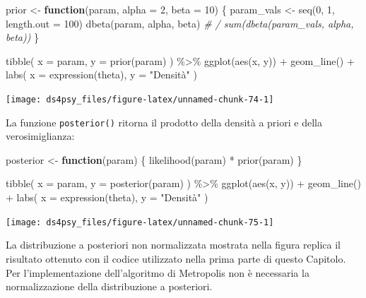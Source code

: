 \documentclass[
  11pt,
]{krantz}
\makeatletter
\newenvironment{Shaded}{\begin{snugshade}}{\end{snugshade}}
\newcommand{\AttributeTok}[1]{\textcolor[rgb]{0.61,0.61,0.61}{#1}}
\newcommand{\CommentTok}[1]{\textcolor[rgb]{0.37,0.37,0.37}{\textit{#1}}}
\newcommand{\ControlFlowTok}[1]{\textcolor[rgb]{0.27,0.27,0.27}{\textbf{#1}}}
\newcommand{\DecValTok}[1]{\textcolor[rgb]{0.06,0.06,0.06}{#1}}
\newcommand{\FunctionTok}[1]{\textcolor[rgb]{0,0,0}{#1}}
\newcommand{\NormalTok}[1]{#1}
\newcommand{\OtherTok}[1]{\textcolor[rgb]{0.37,0.37,0.37}{#1}}
\newcommand{\SpecialCharTok}[1]{\textcolor[rgb]{0,0,0}{#1}}
\newcommand{\StringTok}[1]{\textcolor[rgb]{0.5,0.5,0.5}{#1}}
\newenvironment{kframe}{%
\medskip{}
\setlength{\fboxsep}{.8em}
 \def\at@end@of@kframe{}%
 \ifinner\ifhmode%
  \def\at@end@of@kframe{\end{minipage}}%
  \begin{minipage}{\columnwidth}%
 \fi\fi%
 \def\FrameCommand##1{\hskip\@totalleftmargin \hskip-\fboxsep
 \colorbox{shadecolor}{##1}\hskip-\fboxsep
     \hskip-\linewidth \hskip-\@totalleftmargin \hskip\columnwidth}%
 \MakeFramed {\advance\hsize-\width
   \@totalleftmargin\z@ \linewidth\hsize
   \@setminipage}}%
 {\par\unskip\endMakeFramed%
 \at@end@of@kframe}
\renewenvironment{Shaded}{\begin{kframe}}{\end{kframe}}
\theoremstyle{definition}
\theoremstyle{definition}
\theoremstyle{definition}
\theoremstyle{definition}
\theoremstyle{remark}
\makeatother
\begin{document}
\begin{Shaded}
\begin{Highlighting}[]
\NormalTok{prior }\OtherTok{\textless{}{-}} \ControlFlowTok{function}\NormalTok{(param, }\AttributeTok{alpha =} \DecValTok{2}\NormalTok{, }\AttributeTok{beta =} \DecValTok{10}\NormalTok{) \{}
\NormalTok{  param\_vals }\OtherTok{\textless{}{-}} \FunctionTok{seq}\NormalTok{(}\DecValTok{0}\NormalTok{, }\DecValTok{1}\NormalTok{, }\AttributeTok{length.out =} \DecValTok{100}\NormalTok{)}
  \FunctionTok{dbeta}\NormalTok{(param, alpha, beta) }\CommentTok{\# / sum(dbeta(param\_vals, alpha, beta))}
\NormalTok{\}}

\FunctionTok{tibble}\NormalTok{(}
  \AttributeTok{x =}\NormalTok{ param, }
  \AttributeTok{y =} \FunctionTok{prior}\NormalTok{(param)}
\NormalTok{) }\SpecialCharTok{\%\textgreater{}\%}
  \FunctionTok{ggplot}\NormalTok{(}\FunctionTok{aes}\NormalTok{(x, y)) }\SpecialCharTok{+}
  \FunctionTok{geom\_line}\NormalTok{() }\SpecialCharTok{+}
  \FunctionTok{labs}\NormalTok{(}
    \AttributeTok{x =} \FunctionTok{expression}\NormalTok{(theta),}
    \AttributeTok{y =} \StringTok{"Densità"}
\NormalTok{  )}
\end{Highlighting}
\end{Shaded}

\begin{center}\texttt{[image: ds4psy\_files/figure-latex/unnamed-chunk-74-1]} \end{center}

La funzione \texttt{posterior()} ritorna il prodotto della densità a priori e della verosimiglianza:

\begin{Shaded}
\begin{Highlighting}[]
\NormalTok{posterior }\OtherTok{\textless{}{-}} \ControlFlowTok{function}\NormalTok{(param) \{}
  \FunctionTok{likelihood}\NormalTok{(param) }\SpecialCharTok{*} \FunctionTok{prior}\NormalTok{(param)}
\NormalTok{\}}

\FunctionTok{tibble}\NormalTok{(}
  \AttributeTok{x =}\NormalTok{ param, }
  \AttributeTok{y =} \FunctionTok{posterior}\NormalTok{(param)}
\NormalTok{) }\SpecialCharTok{\%\textgreater{}\%}
  \FunctionTok{ggplot}\NormalTok{(}\FunctionTok{aes}\NormalTok{(x, y)) }\SpecialCharTok{+}
  \FunctionTok{geom\_line}\NormalTok{() }\SpecialCharTok{+}
  \FunctionTok{labs}\NormalTok{(}
    \AttributeTok{x =} \FunctionTok{expression}\NormalTok{(theta),}
    \AttributeTok{y =} \StringTok{"Densità"}
\NormalTok{  )}
\end{Highlighting}
\end{Shaded}

\begin{center}\texttt{[image: ds4psy\_files/figure-latex/unnamed-chunk-75-1]} \end{center}

La distribuzione a posteriori non normalizzata mostrata nella figura replica il risultato ottenuto con il codice utilizzato nella prima parte di questo Capitolo. Per l'implementazione dell'algoritmo di Metropolis non è necessaria la normalizzazione della distribuzione a posteriori.

  

\printindex
\end{document}

